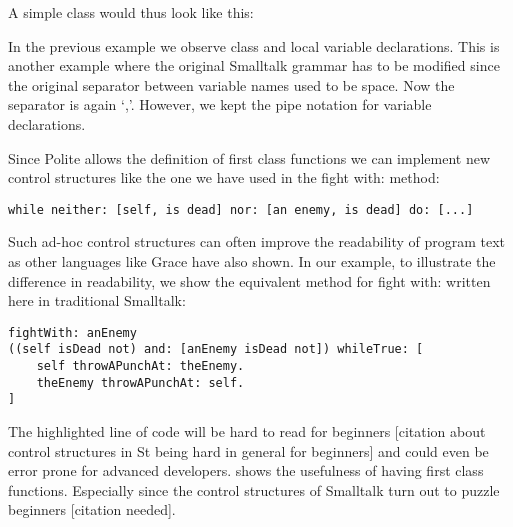 A simple class would thus look like this:
\newpage




In the previous example we observe class and local variable declarations. This is another example where the original Smalltalk grammar has to be modified since the original separator between variable names used to be space. Now the separator is again `,’. However, we kept the pipe notation for variable declarations.

Since Polite allows the definition of first class functions we can implement new control structures like the one we have used in the fight with: method: 

\begin{verbatim}
while neither: [self, is dead] nor: [an enemy, is dead] do: [...] 
\end{verbatim}

Such ad-hoc control structures can often improve the readability of program text as other languages like Grace have also shown. In our example, to illustrate the difference in readability, we show the equivalent method for fight with: written here in traditional Smalltalk:

\begin{verbatim}
fightWith: anEnemy
((self isDead not) and: [anEnemy isDead not]) whileTrue: [
    self throwAPunchAt: theEnemy.
    theEnemy throwAPunchAt: self.
]
\end{verbatim}

The highlighted line of code will be hard to read for beginners [citation about control structures in St being hard in general for beginners] and could even be error prone for advanced developers.  shows the usefulness of having first class functions. Especially since the control structures of Smalltalk turn out to puzzle beginners [citation needed]. 
